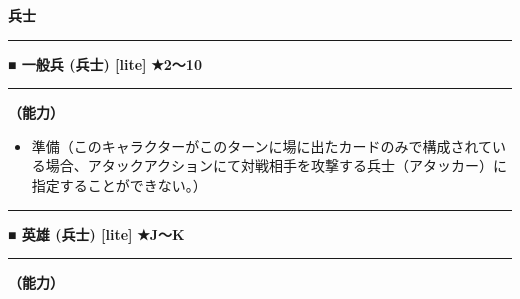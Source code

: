 \documentclass[twocolumn,a5paper,papersize,10pt]{jarticle}
\begin{document}
\begin{tcolorbox}
{\scriptsize\bf 兵士}
\end{tcolorbox}
\vspace{-1zh}%
\vspace{2mm} %
\hrule height 0.5mm depth 0mm width 66.5mm %
\vspace{1mm} %
{\small\bf ■ 一般兵 {\scriptsize (兵士) [lite]}} %
\hfill 
{\footnotesize\bf ★2〜10 }

\vspace{1mm}%
\hrule height 0.1mm depth 0mm width 66.5mm %
\vspace{1mm}%

{\bf（能力）}


\vspace{-1zh}%
\begin{itemize}
\setlength{\leftskip}{-0.3cm}
\setlength{\parskip}{0pt} %

\item 準備（このキャラクターがこのターンに場に出たカードのみで構成されている場合、アタックアクションにて対戦相手を攻撃する兵士（アタッカー）に指定することができない。）
\vspace{-1zh}%
\end{itemize}
\vspace{2mm} %
\hrule height 0.5mm depth 0mm width 66.5mm %
\vspace{1mm} %
{\small\bf ■ 英雄 {\scriptsize (兵士) [lite]}} %
\hfill 
{\footnotesize\bf ★J〜K }

\vspace{1mm}%
\hrule height 0.1mm depth 0mm width 66.5mm %
\vspace{1mm}%

{\bf（能力）}
\end{document}
